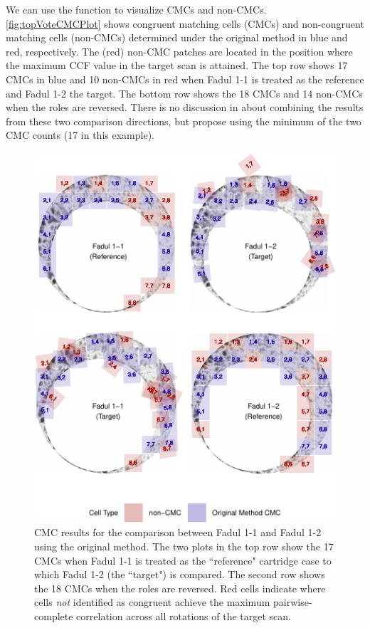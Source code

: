 We can use the  function to visualize CMCs and non-CMCs.
\autoref{fig:topVoteCMCPlot} shows congruent matching cells (CMCs) and
non-congruent matching cells (non-CMCs) determined under the original
method in blue and red, respectively. The (red) non-CMC patches are
located in the position where the maximum CCF value in the target scan
is attained. The top row shows 17 CMCs in blue and 10 non-CMCs in red
when Fadul 1-1 is treated as the reference and Fadul 1-2 the target. The
bottom row shows the 18 CMCs and 14 non-CMCs when the roles are
reversed. There is no discussion in \citet{song_proposed_2013} about
combining the results from these two comparison directions, but
\citet{tong_improved_2015} propose using the minimum of the two CMC
counts (17 in this example).

\begin{Schunk}
\begin{figure}[htbp]

{\centering \includegraphics[width=\textwidth]{figures/kmOriginalMethod}

}

\caption{\label{fig:topVoteCMCPlot} CMC results for the comparison between Fadul 1-1 and Fadul 1-2 using the original method. The two plots in the top row show the 17 CMCs when Fadul 1-1 is treated as the ``reference" cartridge case to which Fadul 1-2 (the ``target") is compared. The second row shows the 18 CMCs when the roles are reversed. Red cells indicate where cells \emph{not} identified as congruent achieve the maximum pairwise-complete correlation across all rotations of the target scan. }\label{fig:unnamed-chunk-16}
\end{figure}
\end{Schunk}

